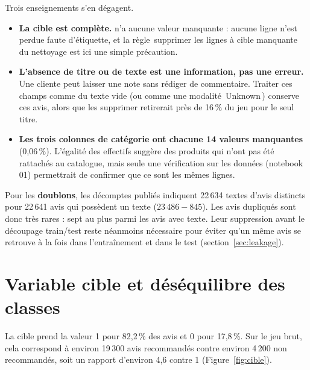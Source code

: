 \documentclass[11pt,a4paper]{report}
\makeatletter
\def\og{\guillemotleft\nobreak\,}%
\def\fg{\unskip\nobreak\,\guillemotright}%
\newcommand{\gl}[1]{\og #1\fg{}}       %
\numberwithin{equation}{chapter}
\DeclareRobustCommand{\code}[1]{{\ttfamily\fontsize{\strip@pt\dimexpr\f@size pt*9/10\relax}{\f@baselineskip}\selectfont\detokenize{#1}}}
\makeatother
\begin{document}
Trois enseignements s'en dégagent.
\begin{itemize}
\item \textbf{La cible est complète.} \code{Recommended IND} n'a aucune valeur manquante : aucune ligne n'est perdue faute d'étiquette, et la règle \gl{supprimer les lignes à cible manquante} du nettoyage est ici une simple précaution.
\item \textbf{L'absence de titre ou de texte est une information, pas une erreur.} Une cliente peut laisser une note sans rédiger de commentaire. Traiter ces champs comme du texte vide (ou comme une modalité \gl{Unknown}) conserve ces avis, alors que les supprimer retirerait près de 16\,\% du jeu pour le seul titre.
\item \textbf{Les trois colonnes de catégorie ont chacune 14 valeurs manquantes} (0,06\,\%). L'égalité des effectifs suggère des produits qui n'ont pas été rattachés au catalogue, mais seule une vérification sur les données (notebook 01) permettrait de confirmer que ce sont les mêmes lignes.
\end{itemize}
Pour les \textbf{doublons}, les décomptes publiés indiquent 22\,634 textes d'avis distincts pour 22\,641 avis qui possèdent un texte ($23\,486 - 845$). Les avis dupliqués sont donc très rares : sept au plus parmi les avis avec texte. Leur suppression avant le découpage train/test reste néanmoins nécessaire pour éviter qu'un même avis se retrouve à la fois dans l'entraînement et dans le test (section~\ref{sec:leakage}).

\section{Variable cible et déséquilibre des classes}\label{sec:cible}
La cible \code{Recommended IND} prend la valeur 1 pour 82,2\,\% des avis et 0 pour 17,8\,\%. Sur le jeu brut, cela correspond à environ 19\,300 avis recommandés contre environ 4\,200 non recommandés, soit un rapport d'environ 4,6 contre 1 (Figure~\ref{fig:cible}).
\end{document}
